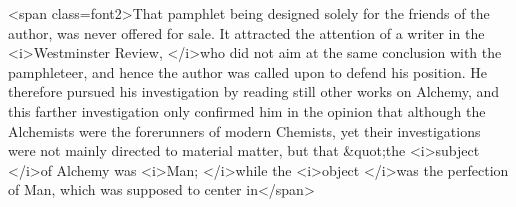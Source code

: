 <span class=font2>That pamphlet being designed solely for the friends of the author, was
never offered for sale. It attracted the attention of a writer in the
<i>Westminster Review, </i>who did not aim at the same conclusion with
the pamphleteer, and hence the author was called upon to defend his
position. He therefore pursued his investigation by reading still
other works on Alchemy, and this farther investigation only confirmed
him in the opinion that although the Alchemists were the forerunners
of modern Chemists, yet their investigations were not mainly directed
to material matter, but that &quot;the <i>subject </i>of Alchemy was <i>Man; </i>while
the <i>object </i>was the perfection of Man, which was supposed to center in</span>\endinput
